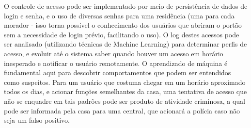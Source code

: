 O controle de acesso pode ser implementado por meio de persistência de dados de login e senha, e o uso de diversas senhas para uma residência (uma para cada morador - isso torna possível o conhecimento dos usuários que abriram o portão sem a necessidade de login prévio, facilitando o uso). O log destes acessos pode ser analisado (utilizando técnicas de Machine Learning) para determinar perfis de acesso, e evoluir até o sistema saber quando houver um acesso em horário inesperado e notificar o usuário remotamente. O aprendizado de máquina é fundamental aqui para descobrir comportamentos que podem ser entendidos como suspeitos. Para um usuário que costuma chegar em um horário aproximado todos os dias, e acionar funções semelhantes da casa, uma tentativa de acesso que não se enquadre em tais padrões pode ser produto de atividade criminosa, a qual pode ser informada pela casa para uma central, que acionará a polícia caso não seja um falso positivo.
